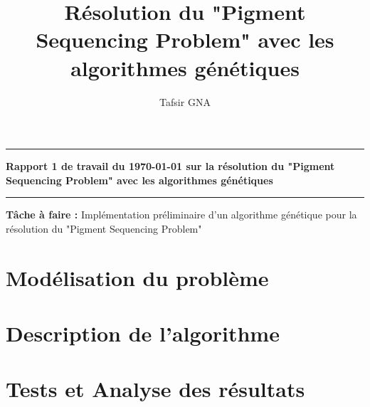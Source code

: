 \documentclass[11pt,a4paper]{article}
\author{Tafsir GNA}
\title{Résolution du "Pigment Sequencing Problem" avec les algorithmes génétiques}
\begin{document}
\hrule
\begin{center}
	\textbf{Rapport 1 de travail du \today{} sur la résolution du "Pigment Sequencing Problem" avec les algorithmes génétiques}
\end{center} 
\hrule

\begin{center}
	\textbf{Tâche à faire :} Implémentation préliminaire d'un algorithme génétique pour la résolution du "Pigment Sequencing Problem" 
\end{center}

\section{Modélisation du problème}

\section{Description de l'algorithme}

\section{Tests et Analyse des résultats}
\end{document}
